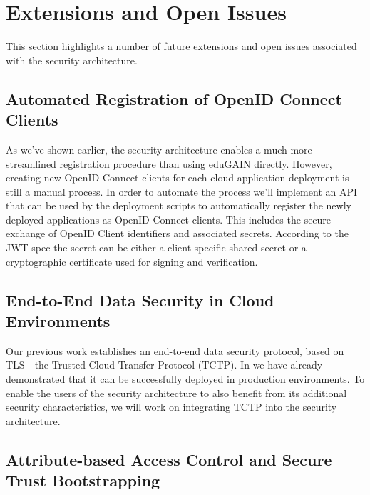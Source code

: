 \documentclass{llncs}
\begin{document}
\section{Extensions and Open Issues}
\label{sec:future}

This section highlights a number of future extensions and open issues associated with the security architecture.

\subsection{Automated Registration of OpenID Connect Clients}

As we've shown earlier, the security architecture enables a much more streamlined registration procedure than using eduGAIN directly. However, creating new OpenID Connect clients for each cloud application deployment is still a manual process. In order to automate the process we'll implement an API that can be used by the deployment scripts to automatically register the newly deployed applications as OpenID Connect clients. This includes the secure exchange of OpenID Client identifiers and associated secrets. According to the JWT spec the secret can be either a client-specific shared secret or a cryptographic certificate used for signing and verification.

\subsection{End-to-End Data Security in Cloud Environments}

Our previous work \cite{S13d} establishes an end-to-end data security protocol, based on TLS - the Trusted Cloud Transfer Protocol (TCTP). In \cite{SERKZ14} we have already demonstrated that it can be successfully deployed in production environments. To enable the users of the security architecture to also benefit from its additional security characteristics, we will work on integrating TCTP into the security architecture.

\subsection{Attribute-based Access Control and Secure Trust Bootstrapping}
\end{document}
